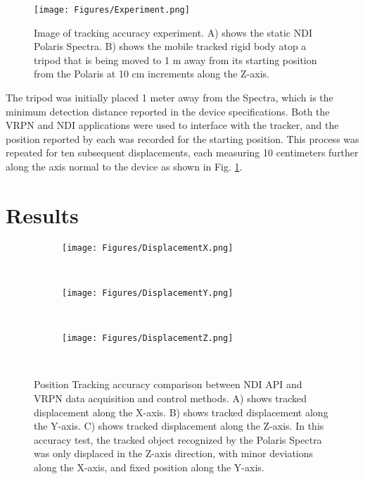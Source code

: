 \documentclass[]{spie}  %
\begin{document}
\begin{figure}[htb]
      \centering
      \texttt{[image: Figures/Experiment.png]}
      \caption{Image of tracking accuracy experiment. A) shows the static NDI Polaris Spectra. B) shows the mobile tracked rigid body atop a tripod that is being moved to 1 m away from its starting position from the Polaris at 10 cm increments along the Z-axis.}
      \label{Exp}
\end{figure}

The tripod was initially placed 1 meter away from the Spectra, which is the minimum detection distance reported in the device specifications. Both the VRPN and NDI applications were used to interface with the tracker, and the position reported by each was recorded for the starting position. This process was repeated for ten subsequent displacements, each measuring 10 centimeters further along the axis normal to the device as shown in Fig. \ref{Exp}. 

%


%
%
\section{Results}

\begin{figure}[htb]
    \centering
    \begin{subfigure}[b]{0.49\textwidth}
        \texttt{[image: Figures/DisplacementX.png]}
    \end{subfigure}
    ~ %
    \begin{subfigure}[b]{0.49\textwidth}
        \texttt{[image: Figures/DisplacementY.png]}
		\end{subfigure}
		~ %
		\begin{subfigure}[c]{0.55\textwidth}
				\texttt{[image: Figures/DisplacementZ.png]}
    \end{subfigure}
    ~ %

    \caption{Position Tracking accuracy comparison between NDI API and VRPN data acquisition and control methods. A) shows tracked displacement along the X-axis. B) shows tracked displacement along the Y-axis. C) shows tracked displacement along the Z-axis. In this accuracy test, the tracked object recognized by the Polaris Spectra was only displaced in the Z-axis direction, with minor deviations along the X-axis, and fixed position along the Y-axis.}
		\label{Disp}
\end{figure}
\end{document}
